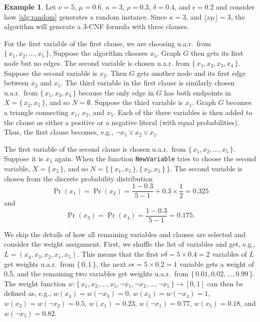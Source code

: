 \documentclass{article}
\theoremstyle{definition}
\newtheorem{example}{Example}
\begin{document}
\begin{example}\label{example:algorithm}
  Let $\nu = 5$, $\mu = 0.6$, $\kappa = 3$, $\rho = 0.3$, $\delta = 0.4$,
  and $\epsilon = 0.2$ and consider how \cref{alg:random} generates a random
  instance. Since $\kappa = 3$, and $\lfloor\nu\mu\rfloor = 3$,
  the algorithm will generate a 3-CNF formula with three clauses.

  For the first variable of the first clause, we are choosing u.a.r.\ from $\{\,
  x_1, x_2, \dots, x_5 \,\}$. Suppose the algorithm chooses $x_5$. Graph $G$
  then gets its first node but no edges. The second variable is chosen u.a.r.
  from $\{\, x_1, x_2, x_3, x_4 \,\}$. Suppose the second variable is $x_2$.
  Then $G$ gets another node and its first edge between $x_2$ and $x_5$. The
  third variable in the first clause is similarly chosen u.a.r.\ from $\{\, x_1,
  x_3, x_4 \,\}$ because the only edge in $G$ has both endpoints in $X = \{\,
  x_2, x_5 \,\}$, and so $N = \emptyset$. Suppose the third variable is $x_1$.
  Graph $G$ becomes a triangle connecting $x_1$, $x_2$, and $x_5$. Each of
  the three variables is then added to the clause as either a positive or a
  negative literal (with equal probabilities). Thus, the first clause becomes,
  e.g., $\neg x_5 \lor x_2 \lor x_1$.

  The first variable of the second clause is chosen u.a.r.\ from $\{\, x_1, x_2,
  \dots, x_5\,\}$. Suppose it is $x_5$ again. When the function
  \texttt{NewVariable} tries to choose the second variable, $X = \{\, x_5 \,\}$,
  and so $N = \{\, \{\, x_1, x_5 \,\}, \{\, x_2, x_5 \,\}\,\}$. The second
  variable is chosen from the discrete probability distribution
  \[
    \Pr(x_1) = \Pr(x_2) = \frac{1 - 0.3}{5 - 1} + 0.3 \times \frac{1}{2} = 0.325
  \]
  and
  \[
    \Pr(x_3) = \Pr(x_4) = \frac{1 - 0.3}{5 - 1} = 0.175.
  \]

  We skip the details of how all remaining variables and clauses are selected
  and consider the weight assignment. First, we shuffle the list of variables
  and get, e.g., $L = (x_4, x_3, x_2, x_1, x_5)$. This means that the first
  $\nu\delta = 5 \times 0.4 = 2$ variables of $L$ get weights u.a.r.\ from $\{\,
  0, 1 \,\}$, the next $\nu\epsilon = 5 \times 0.2 = 1$ variable gets a weight
  of 0.5, and the remaining two variables get weights u.a.r.\ from $\{\,0.01,
  0.02, \dots, 0.99 \,\}$. The weight function $w\colon \{\, x_1, x_2, \dots,
  x_5, \neg x_1, \neg x_2, \dots, \neg x_5\,\} \to [0, 1]$ can then be defined
  as, e.g., $w(x_4) = w(\neg x_3) = 0$, $w(x_3) = w(\neg x_4) = 1$, $w(x_2) =
  w(\neg x_2) = 0.5$, $w(x_1) = 0.23$, $w(\neg x_1) = 0.77$, $w(x_5) = 0.18$,
  and $w(\neg x_5) = 0.82$.
\end{example}
\end{document}
